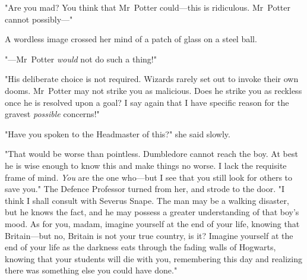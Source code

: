 "Are you mad? You think that Mr~Potter could---this is ridiculous. Mr~Potter
cannot possibly---"

A wordless image crossed her mind of a patch of glass on a steel ball.

"---Mr~Potter \emph{would} not do such a thing!"

"His deliberate choice is not required. Wizards rarely set out to invoke their
own dooms. Mr~Potter may not strike you as malicious. Does he strike you as
reckless once he is resolved upon a goal? I say again that I have specific
reason for the gravest \emph{possible} concerns!"

"Have you spoken to the Headmaster of this?" she said slowly.

"That would be worse than pointless. Dumbledore cannot reach the boy. At best
he is wise enough to know this and make things no worse. I lack the requisite
frame of mind. \emph{You} are the one who---but I see that you still look for
others to save you." The Defence Professor turned from her, and strode to the
door. "I think I shall consult with Severus Snape. The man may be a walking
disaster, but he knows the fact, and he may possess a greater understanding of
that boy's mood. As for you, madam, imagine yourself at the end of your life,
knowing that Britain---but no, Britain is not your true country, is it? Imagine
yourself at the end of your life as the darkness eats through the fading walls
of Hogwarts, knowing that your students will die with you, remembering this day
and realizing there was something else you could have done."
